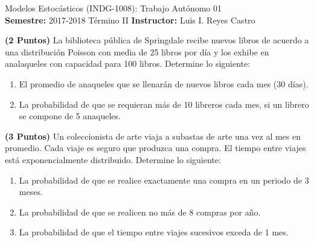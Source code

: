 \documentclass[ a4paper, twoside, 11pt]{article}
\newcommand{\numero}{01}
\begin{document}
\allowdisplaybreaks



\begin{center}
\Large Modelos Estoc\'asticos (INDG-1008): Trabajo Aut\'onomo \numero \\[1ex]
\small \textbf{Semestre:} 2017-2018 T\'ermino II \qquad
\textbf{Instructor:} Luis I. Reyes Castro
\end{center}
\fullskip

%

\halfskip

\begin{problem}
\textbf{(2 Puntos)} La biblioteca p\'ublica de Springdale recibe nuevos libros de acuerdo a una distribuci\'on Poisson con media de 25 libros por d\'ia y los exhibe en analaqueles con capacidad para 100 libros. Determine lo siguiente: 
\begin{enumerate}[label=\alph*)]
\item El promedio de anaqueles que se llenar\'an de nuevos libros cada mes (30 d\'ias). 
\item La probabilidad de que se requieran m\'as de 10 libreros cada mes, si un librero se compone de 5 anaqueles.
\end{enumerate}

\end{problem}
\vspace{\baselineskip}

\begin{problem}
\textbf{(3 Puntos)} Un coleccionista de arte viaja a subastas de arte una vez al mes en promedio. Cada viaje es seguro que produzca una compra. El tiempo entre viajes est\'a exponencialmente distribuido. Determine lo siguiente: 
\begin{enumerate}[label=\alph*)]
\item La probabilidad de que se realice exactamente una compra en un periodo de 3 meses. 
\item La probabilidad de que se realicen no m\'as de 8 compras por año. 
\item La probabilidad de que el tiempo entre viajes sucesivos exceda de 1 mes. 
\end{enumerate}

\end{problem}
\vspace{\baselineskip}
\end{document}
